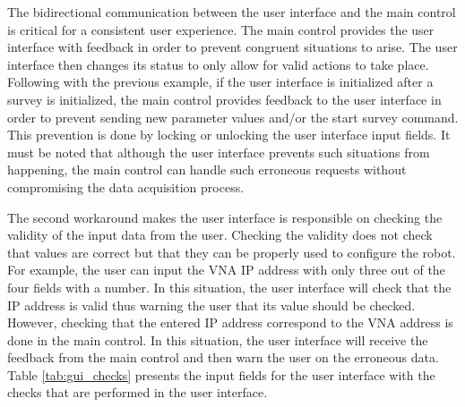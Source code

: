 \documentclass{article}
\begin{document}
The bidirectional communication between the user interface and the main control is critical for a consistent user experience. The main control provides the user interface with feedback in order to prevent congruent situations to arise. The user interface then changes its status to only allow for valid actions to take place. Following with the previous example, if the user interface is initialized after a survey is initialized, the main control provides feedback to the user interface in order to prevent sending new parameter values and/or the start survey command. This prevention is done by locking or unlocking the user interface input fields. It must be noted that although the user interface prevents such situations from happening, the main control can handle such erroneous requests without compromising the data acquisition process. 

The second workaround makes the user interface is responsible on checking the validity of the input data from the user. Checking the validity does not check that values are correct but that they can be properly used to configure the robot. For example, the user can input the VNA IP address with only three out of the four fields with a number. In this situation, the user interface will check that the IP address is valid thus warning the user that its value should be checked. However, checking that the entered IP address correspond to the VNA address is done in the main control. In this situation, the user interface will receive the feedback from the main control and then warn the user on the erroneous data. Table \ref{tab:gui_checks} presents the input fields for the user interface with the checks that are performed in the user interface.
\end{document}

